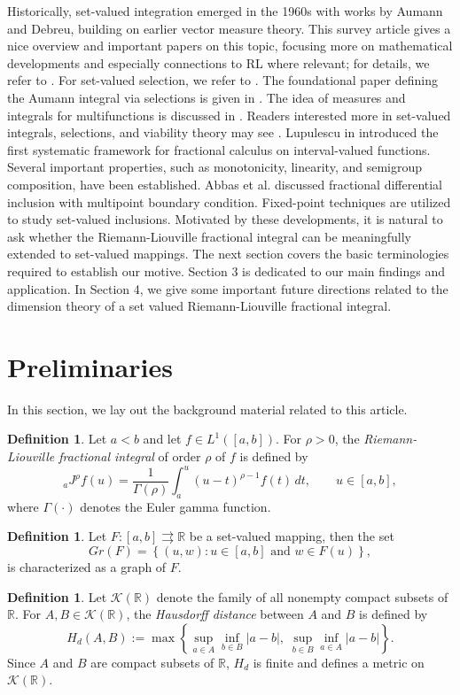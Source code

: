 \documentclass[a4paper,12pt,reqno]{amsart}
\numberwithin{equation}{section}
\theoremstyle{definition}
\newtheorem{definition}[theorem]{Definition}
\theoremstyle{remark}
\numberwithin{equation}{section}
\begin{document}
Historically, set-valued integration emerged in the 1960s with works by Aumann and Debreu, building on earlier vector measure theory. This survey article gives a nice overview and important papers on this topic, focusing more on mathematical developments and especially connections to RL where relevant; for details, we refer to \cite{anca}. For set-valued selection, we refer to \cite{hess}. The foundational paper defining the Aumann integral via selections is given in \cite{aumann1965integrals}. The idea of  measures and integrals for multifunctions is discussed in \cite{art}. Readers interested more in set-valued integrals, selections, and viability theory may see \cite{aubin1}. Lupulescu in \cite{lup} introduced the first systematic framework for fractional calculus on interval-valued functions. Several important properties, such as monotonicity, linearity, and semigroup composition, have been established. Abbas et al. \cite{azam} discussed fractional differential inclusion with multipoint boundary condition. Fixed-point techniques are utilized to study set-valued inclusions. 
Motivated by these developments, it is natural to ask whether the Riemann-Liouville fractional integral can be meaningfully extended to set-valued mappings. The next section covers the basic terminologies required to establish our motive. Section 3 is dedicated to our main findings and application. In Section 4, we give some important future directions related to the dimension theory of a set valued Riemann-Liouville fractional integral.

\pagebreak

\section{Preliminaries} \label{Prelim}

In this section, we lay out the background material related to this article.
\begin{definition} 
   Let $a<b$ and let $f\in L^{1}([a,b])$. For $\rho>0$, the
\emph{Riemann-Liouville fractional integral} of order $\rho$ of $f$ is
defined by
$$
{}_{a}J^{\rho}f(u) = \frac{1}{\Gamma(\rho)}
\int_{a}^{u}(u-t)^{\rho-1}f(t)\,dt,
\qquad u\in[a,b], $$
where $\Gamma(\cdot)$ denotes the Euler gamma function.
\end{definition}

\begin{definition}
Let $F:[a,b]\rightrightarrows \mathbb{R}$ be a set-valued mapping, then the set
\[Gr(F)=\left\{(u,w): u\in[a,b] \text{ and } w\in F(u)\right\},\]
is characterized as a graph of $F$. 
\end{definition}
\begin{definition}
Let $\mathcal{K}(\mathbb{R})$ denote the family of all nonempty compact 
subsets of $\mathbb{R}$. For $A,B\in\mathcal{K}(\mathbb{R})$, the 
\emph{Hausdorff distance} between $A$ and $B$ is defined by
\[
H_d(A,B)
:=
\max\left\{
\sup_{a\in A}\inf_{b\in B} |a-b|,\;
\sup_{b\in B}\inf_{a\in A} |a-b|
\right\}.
\]
Since $A$ and $B$ are compact subsets of $\mathbb{R}$, $H_d$ is finite and 
defines a metric on $\mathcal{K}(\mathbb{R})$.
\end{definition}
\end{document}
